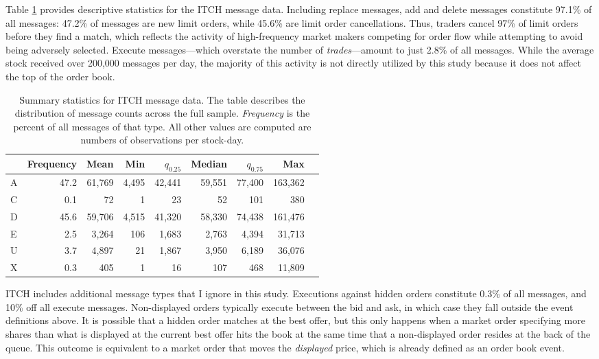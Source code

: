 	Table \ref{tab:message_counts} provides descriptive statistics for the ITCH message data. Including replace messages, add and delete messages constitute 97.1\% of all messages: 47.2\% of messages are new limit orders, while 45.6\% are limit order cancellations. Thus, traders cancel 97\% of limit orders before they find a match, which reflects the activity of high-frequency market makers competing for order flow while attempting to avoid being adversely selected. Execute messages---which overstate the number of \textit{trades}---amount to just 2.8\% of all messages. While the average stock received over 200,000 messages per day, the majority of this activity is not directly utilized by this study because it does not affect the top of the order book.

	\begin{table}[t]
		\small
		\linespread{1}
		\centering
		\begin{tabular*}{\textwidth}{@{\extracolsep{\fill}}lrrrrrrrr}
			\toprule{}
			 &  Frequency  &   Mean  & Min &  $q_{0.25}$ &  Median &    $q_{0.75}$   &        Max \\
			\midrule
			A &  47.2  &  61,769 &  4,495 &  42,441 &  59,551 &  77,400 &  163,362 \\
			C &  0.1   &      72 &     1  &      23 &      52 &     101 &      380 \\
			D &  45.6  &  59,706 &  4,515 &  41,320 &  58,330 &  74,438 &  161,476 \\
			E &  2.5   &   3,264 &   106  &   1,683 &   2,763 &   4,394 &   31,713 \\
			U &  3.7   &   4,897 &     21 &   1,867 &   3,950 &   6,189 &   36,076 \\
			X &  0.3   &     405 &      1 &      16 &     107 &     468 &   11,809 \\
			\bottomrule
		\end{tabular*}
		\captionsetup{position=below, font=footnotesize, justification=justified, width=\linewidth}
		\caption[Summary statistics for ITCH message data]{Summary statistics for ITCH message data. The table describes the distribution of message counts across the full sample. \textit{Frequency} is the percent of all messages of that type. All other values are computed are numbers of observations per stock-day.}
		\label{tab:message_counts}
	\end{table}

	ITCH includes additional message types that I ignore in this study. Executions against hidden orders constitute 0.3\% of all messages, and 10\% off all execute messages. Non-displayed orders typically execute between the bid and ask, in which case they fall outside the event definitions above. It is possible that a hidden order matches at the best offer, but this only happens when a market order specifying more shares than what is displayed at the current best offer hits the book at the same time that a non-displayed order resides at the back of the queue. This outcome is equivalent to a market order that moves the \textit{displayed} price, which is already defined as an order book event.

